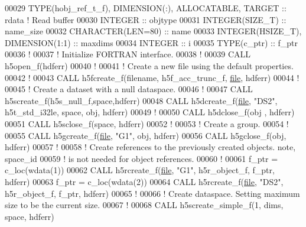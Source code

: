 \begin{DoxyCode}
00029   \textcolor{keywordtype}{TYPE}(hobj\_ref\_t\_f), \textcolor{keywordtype}{DIMENSION(:)}, \textcolor{keywordtype}{ALLOCATABLE}, \textcolor{keywordtype}{TARGET} :: rdata \textcolor{comment}{! Read buffer}
00030   \textcolor{keywordtype}{INTEGER} :: objtype
00031   \textcolor{keywordtype}{INTEGER(SIZE\_T)} :: name\_size
00032   \textcolor{keywordtype}{CHARACTER(LEN=80)} :: name
00033   \textcolor{keywordtype}{INTEGER(HSIZE\_T)}, \textcolor{keywordtype}{DIMENSION(1:1)} :: maxdims
00034   \textcolor{keywordtype}{INTEGER} :: i
00035   \textcolor{keywordtype}{TYPE}(c\_ptr) :: f\_ptr
00036   \textcolor{comment}{!}
00037   \textcolor{comment}{! Initialize FORTRAN interface.}
00038   \textcolor{comment}{!}
00039   \textcolor{keyword}{CALL }h5open\_f(hdferr)
00040   \textcolor{comment}{!}
00041   \textcolor{comment}{! Create a new file using the default properties.}
00042   \textcolor{comment}{!}
00043   \textcolor{keyword}{CALL }h5fcreate\_f(filename, h5f\_acc\_trunc\_f, \hyperlink{structfile}{file}, hdferr)
00044   \textcolor{comment}{!}
00045   \textcolor{comment}{! Create a dataset with a null dataspace.}
00046   \textcolor{comment}{!}
00047   \textcolor{keyword}{CALL }h5screate\_f(h5s\_null\_f,space,hdferr)
00048   \textcolor{keyword}{CALL }h5dcreate\_f(\hyperlink{structfile}{file}, \textcolor{stringliteral}{"DS2"}, h5t\_std\_i32le, space, obj, hdferr)
00049   \textcolor{comment}{!}
00050   \textcolor{keyword}{CALL }h5dclose\_f(obj  , hdferr)
00051   \textcolor{keyword}{CALL }h5sclose\_f(space, hdferr)
00052   \textcolor{comment}{!}
00053   \textcolor{comment}{! Create a group.}
00054   \textcolor{comment}{!}
00055   \textcolor{keyword}{CALL }h5gcreate\_f(\hyperlink{structfile}{file}, \textcolor{stringliteral}{"G1"}, obj, hdferr)
00056   \textcolor{keyword}{CALL }h5gclose\_f(obj, hdferr)
00057   \textcolor{comment}{!}
00058   \textcolor{comment}{! Create references to the previously created objects. note, space\_id}
00059   \textcolor{comment}{! is not needed for object references.}
00060   \textcolor{comment}{!}
00061   f\_ptr = c\_loc(wdata(1))
00062   \textcolor{keyword}{CALL }h5rcreate\_f(\hyperlink{structfile}{file}, \textcolor{stringliteral}{"G1"}, h5r\_object\_f, f\_ptr, hdferr)
00063   f\_ptr = c\_loc(wdata(2))
00064   \textcolor{keyword}{CALL }h5rcreate\_f(\hyperlink{structfile}{file}, \textcolor{stringliteral}{"DS2"}, h5r\_object\_f, f\_ptr, hdferr)
00065   \textcolor{comment}{!}
00066   \textcolor{comment}{! Create dataspace.  Setting maximum size to be the current size.}
00067   \textcolor{comment}{!}
00068   \textcolor{keyword}{CALL }h5screate\_simple\_f(1, dims, space, hdferr)

\end{DoxyCode}
